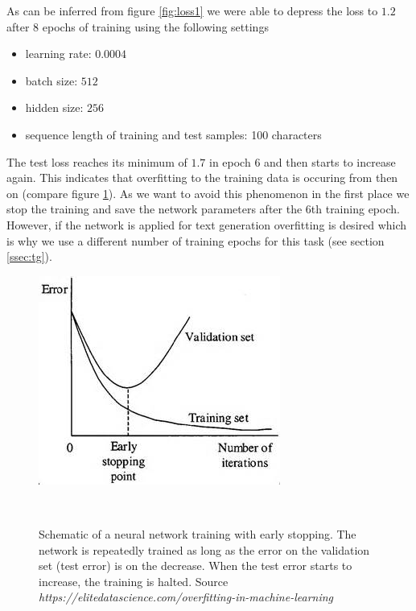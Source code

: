 \documentclass[11pt,a4paper,bibliography=totocnumbered,listof=totocnumbered]{scrartcl}
\begin{document}
As can be inferred from figure \ref{fig:loss1} we were able to depress the loss to $1.2$ after $8$ epochs of training using the following settings
\begin{itemize}
	\item learning rate: $0.0004$
	\item batch size: $512$
	\item hidden size: $256$
	\item sequence length of training and test samples: 100 characters
\end{itemize}
The test loss reaches its minimum of $1.7$ in epoch $6$ and then starts to increase again. This indicates that overfitting to the training data is occuring from then on (compare figure \ref{fig:stop}). As we want to avoid this phenomenon in the first place we stop the training and save the network parameters after the $6$th training epoch. However, if the network is applied for text generation overfitting is desired which is why we use a different number of training epochs for this task (see section \ref{ssec:tg}).

\begin{figure}[H]
   \begin{minipage}{\textwidth}
     \centering
     \includegraphics[width=.4\textwidth]{early-stopping-graphic}
     \caption{Schematic of a neural network training with early stopping. The network is repeatedly trained as long as the error on the validation set (test error) is on the decrease. When the test error starts to increase, the training is halted. Source \textit{https://elitedatascience.com/overfitting-in-machine-learning}}
     \label{fig:stop}
   \end{minipage}\\[1em]   
\end{figure}
\end{document}
